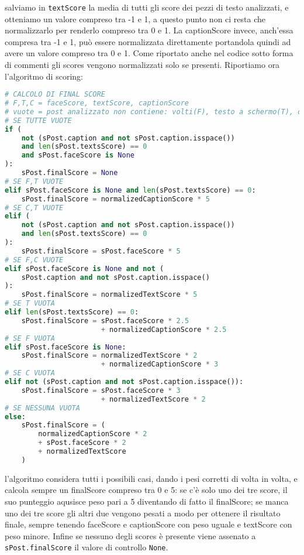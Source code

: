 salviamo in \verb+textScore+ la media di tutti gli score dei pezzi di testo analizzati, e otteniamo
un valore compreso tra -1 e 1, a questo punto non ci resta che normalizzarlo per renderlo compreso
tra 0 e 1. 
La captionScore invece, anch'essa compresa tra -1 e 1, può essere normalizzata direttamente portandola
quindi ad avere un valore compreso tra 0 e 1.
Come riportato anche nel codice sotto forma di commenti gli scores vengono normalizzati solo se presenti.
Riportiamo ora l'algoritmo di scoring:
\begin{lstlisting}[language=Python]
# CALCOLO DI FINAL SCORE
# F,T,C = faceScore, textScore, captionScore
# vuote = post analizzato non contiene: volti(F), testo a schermo(T), caption(C)
# SE TUTTE VUOTE
if (
    not (sPost.caption and not sPost.caption.isspace())
    and len(sPost.textsScore) == 0
    and sPost.faceScore is None
):
    sPost.finalScore = None
# SE F,T VUOTE
elif sPost.faceScore is None and len(sPost.textsScore) == 0:
    sPost.finalScore = normalizedCaptionScore * 5
# SE C,T VUOTE
elif (
    not (sPost.caption and not sPost.caption.isspace())
    and len(sPost.textsScore) == 0
):
    sPost.finalScore = sPost.faceScore * 5
# SE F,C VUOTE
elif sPost.faceScore is None and not (
    sPost.caption and not sPost.caption.isspace()
):
    sPost.finalScore = normalizedTextScore * 5
# SE T VUOTA
elif len(sPost.textsScore) == 0:
    sPost.finalScore = sPost.faceScore * 2.5 
                       + normalizedCaptionScore * 2.5
# SE F VUOTA
elif sPost.faceScore is None:
    sPost.finalScore = normalizedTextScore * 2 
                       + normalizedCaptionScore * 3
# SE C VUOTA
elif not (sPost.caption and not sPost.caption.isspace()):
    sPost.finalScore = sPost.faceScore * 3 
                       + normalizedTextScore * 2
# SE NESSUNA VUOTA
else:
    sPost.finalScore = (
        normalizedCaptionScore * 2 
        + sPost.faceScore * 2 
        + normalizedTextScore
    )
\end{lstlisting}
l'algoritmo considera tutti i possibili casi, dando i pesi corretti di volta in volta, e calcola
sempre un finalScore compreso tra 0 e 5: se c'è solo uno dei tre score, il suo punteggio aqusisce
peso pari a 5 diventando di fatto il finalScore; se manca uno dei tre score gli altri due vengono
pesati a modo per ottenere il risultato finale, sempre tenendo faceScore e captionScore con peso
uguale e textScore con peso minore.
Infine se nessuno degli scores è presente viene assenato a \verb+sPost.finalScore+ il valore di
controllo \verb+None+.




